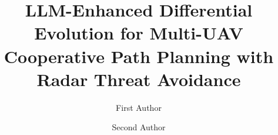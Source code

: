 
\title{LLM-Enhanced Differential Evolution for Multi-UAV Cooperative Path
       Planning with Radar Threat Avoidance}

\author[inst1]{First Author}

\author[inst2]{Second Author}


\address[inst1]{School of XXX, University of XXX, City, Postcode, China}
\address[inst2]{Department of XXX, XXX Institute, City, Postcode, China}

